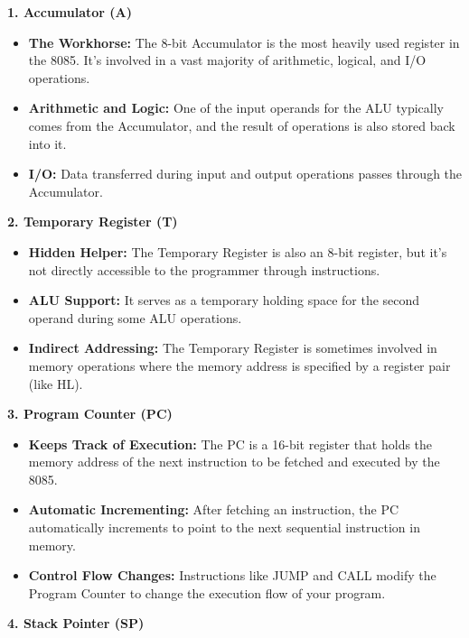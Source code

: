 \documentclass[
]{article}
\begin{document}
\textbf{1. Accumulator (A)}

\begin{itemize}
\item
  \textbf{The Workhorse:} The 8-bit Accumulator is the most heavily used
  register in the 8085. It's involved in a vast majority of arithmetic,
  logical, and I/O operations.
\item
  \textbf{Arithmetic and Logic:} One of the input operands for the ALU
  typically comes from the Accumulator, and the result of operations is
  also stored back into it.
\item
  \textbf{I/O:} Data transferred during input and output operations
  passes through the Accumulator.
\end{itemize}

\textbf{2. Temporary Register (T)}

\begin{itemize}
\item
  \textbf{Hidden Helper:} The Temporary Register is also an 8-bit
  register, but it's not directly accessible to the programmer through
  instructions.
\item
  \textbf{ALU Support:} It serves as a temporary holding space for the
  second operand during some ALU operations.
\item
  \textbf{Indirect Addressing:} The Temporary Register is sometimes
  involved in memory operations where the memory address is specified by
  a register pair (like HL).
\end{itemize}

\textbf{3. Program Counter (PC)}

\begin{itemize}
\item
  \textbf{Keeps Track of Execution:} The PC is a 16-bit register that
  holds the memory address of the next instruction to be fetched and
  executed by the 8085.
\item
  \textbf{Automatic Incrementing:} After fetching an instruction, the PC
  automatically increments to point to the next sequential instruction
  in memory.
\item
  \textbf{Control Flow Changes:} Instructions like JUMP and CALL modify
  the Program Counter to change the execution flow of your program.
\end{itemize}

\textbf{4. Stack Pointer (SP)}
\end{document}
